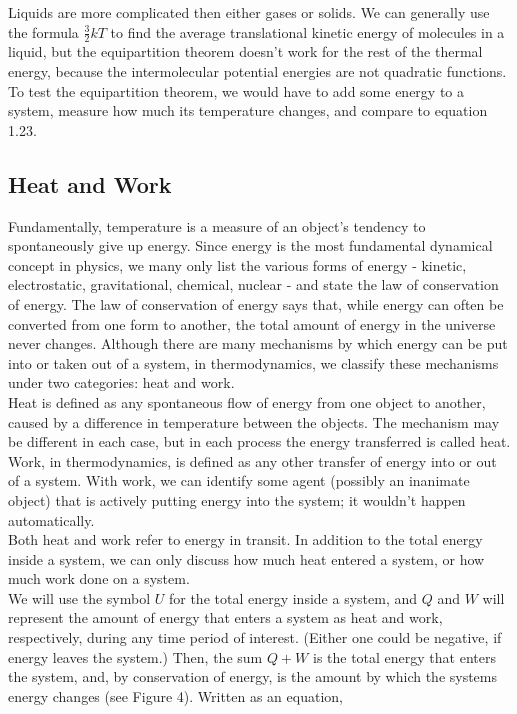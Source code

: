 \documentclass[11pt]{exam}
\begin{document}
\hspace*{10mm}Liquids are more complicated then either gases or solids. We can generally use the formula $\frac{3}{2}kT$ to find the average translational kinetic energy of molecules in a liquid, but the equipartition theorem doesn't work for the rest of the thermal energy, because the intermolecular potential energies are not quadratic functions. \\
\hspace*{10mm}To test the equipartition theorem, we would have to add some energy to a system, measure how much its temperature changes, and compare to equation 1.23. 
\newpage
\subsection{Heat and Work}
\hspace*{10mm}Fundamentally, temperature is a measure of an object's tendency to spontaneously give up energy. Since energy is the most fundamental dynamical concept in physics, we many only list the various forms of energy - kinetic, electrostatic, gravitational, chemical, nuclear - and state the law of conservation of energy. The law of conservation of energy says that, while energy can often be converted from one form to another, the total amount of energy in the universe never changes. Although there are many mechanisms by which energy can be put into or taken out of a system, in thermodynamics, we classify these mechanisms under two categories: heat and work. \\
\hspace*{10mm}Heat is defined as any spontaneous flow of energy from one object to another, caused by a difference in temperature between the objects. The mechanism may be different in each case, but in each process the energy transferred is called heat. \\
\hspace*{10mm}Work, in thermodynamics, is defined as any other transfer of energy into or out of a system. With work, we can identify some agent (possibly an inanimate object) that is actively putting energy into the system; it wouldn't happen automatically. \\
\hspace*{10mm}Both heat and work refer to energy in transit. In addition to the total energy inside a system, we can only discuss how much heat entered a system, or how much work done on a system. \\
\hspace*{10mm}We will use the symbol $U$ for the total energy inside a system, and $Q$ and $W$ will represent the amount of energy that enters a system as heat and work, respectively, during any time period of interest. (Either one could be negative, if energy leaves the system.) Then, the sum $Q+W$ is the total energy that enters the system, and, by conservation of energy, is the amount by which the systems energy changes (see Figure 4). Written as an equation, 
\end{document}

